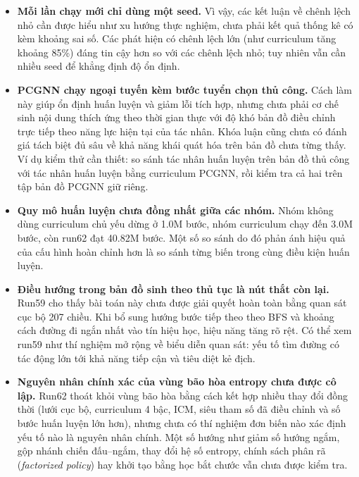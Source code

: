 \begin{itemize}
    \item \textbf{Mỗi lần chạy mới chỉ dùng một seed.} Vì vậy, các kết luận về chênh lệch nhỏ cần được hiểu như xu hướng thực nghiệm, chưa phải kết quả thống kê có kèm khoảng sai số. Các phát hiện có chênh lệch lớn (như curriculum tăng khoảng 85\%) đáng tin cậy hơn so với các chênh lệch nhỏ; tuy nhiên vẫn cần nhiều seed để khẳng định độ ổn định.

    \item \textbf{PCGNN chạy ngoại tuyến kèm bước tuyển chọn thủ công.} Cách làm này giúp ổn định huấn luyện và giảm lỗi tích hợp, nhưng chưa phải cơ chế sinh nội dung thích ứng theo thời gian thực với độ khó bản đồ điều chỉnh trực tiếp theo năng lực hiện tại của tác nhân. Khóa luận cũng chưa có đánh giá tách biệt đủ sâu về khả năng khái quát hóa trên bản đồ chưa từng thấy. Ví dụ kiểm thử cần thiết: so sánh tác nhân huấn luyện trên bản đồ thủ công với tác nhân huấn luyện bằng curriculum PCGNN, rồi kiểm tra cả hai trên tập bản đồ PCGNN giữ riêng.

    \item \textbf{Quy mô huấn luyện chưa đồng nhất giữa các nhóm.} Nhóm không dùng curriculum chủ yếu dừng ở 1.0M bước, nhóm curriculum chạy đến 3.0M bước, còn run62 đạt 40.82M bước. Một số so sánh do đó phản ánh hiệu quả của cấu hình hoàn chỉnh hơn là so sánh từng biến trong cùng điều kiện huấn luyện.

    \item \textbf{Điều hướng trong bản đồ sinh theo thủ tục là nút thắt còn lại.} Run59 cho thấy bài toán này chưa được giải quyết hoàn toàn bằng quan sát cục bộ 207 chiều. Khi bổ sung hướng bước tiếp theo theo BFS và khoảng cách đường đi ngắn nhất vào tín hiệu học, hiệu năng tăng rõ rệt. Có thể xem run59 như thí nghiệm mở rộng về biểu diễn quan sát: yếu tố tìm đường có tác động lớn tới khả năng tiếp cận và tiêu diệt kẻ địch.

    \item \textbf{Nguyên nhân chính xác của vùng bão hòa entropy chưa được cô lập.} Run62 thoát khỏi vùng bão hòa bằng cách kết hợp nhiều thay đổi đồng thời (lưới cục bộ, curriculum 4 bậc, ICM, siêu tham số đã điều chỉnh và số bước huấn luyện lớn hơn), nhưng chưa có thí nghiệm đơn biến nào xác định yếu tố nào là nguyên nhân chính. Một số hướng như giảm số hướng ngắm, gộp nhánh chiến đấu--ngắm, thay đổi hệ số entropy, chính sách phân rã (\emph{factorized policy}) hay khởi tạo bằng học bắt chước vẫn chưa được kiểm tra.
\end{itemize}


